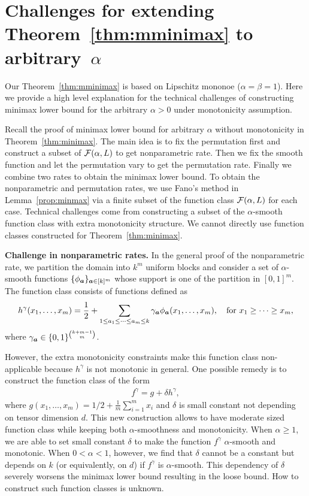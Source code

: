 \documentclass[12pt]{article}
\theoremstyle{definition}
\begin{document}
{\color{blue}
\section{Challenges for extending Theorem~\ref{thm:mminimax} to arbitrary~$\alpha$}\label{subsec:generala}
Our Theorem~\ref{thm:mminimax} is based on Lipschitz mononoe ($\alpha = \beta=1$). Here we provide a high level explanation for the technical challenges of constructing minimax lower bound for the arbitrary $\alpha>0$ under monotonicity assumption. 

Recall the proof of minimax lower bound for arbitrary $\alpha$ without monotonicity in Theorem~\ref{thm:minimax}. The main idea is to fix the permutation first and construct a subset of $\mathcal{F}(\alpha,L)$ to get nonparametric rate. Then we fix the smooth function and let the permutation vary to get the permutation rate. Finally we combine two rates to obtain the minimax lower bound. To obtain the nonparametric and permutation rates, we use Fano's method in Lemma~\ref{prop:minmax} via a finite subset of the function class $\mathcal{F}(\alpha,L)$ for each case. Technical challenges come from constructing a subset of the $\alpha$-smooth function class with extra monotonicity structure. We cannot directly use function classes constructed for Theorem~\ref{thm:minimax}. 

{\bf Challenge in nonparametric rates.} In the general proof of the nonparametric rate, we partition the domain  into $k^m$ uniform blocks and consider a set of $\alpha$-smooth functions $\{\phi_{\bm{a}}\}_{\bm{a}\in [k]^m}$ whose support is one of the partition in $[0,1]^m$. The function class consists of functions defined as
\begin{align}
    h^{\gamma}(x_1,\ldots,x_m) = \frac{1}{2}+\sum_{1\leq a_1\leq\cdots\leq a_m\leq k}\gamma_{\bm{a}}\phi_{\bm{a}}(x_1,\ldots,x_m),\quad \text{for } x_1\geq\cdots\geq x_m,
\end{align}
where $\gamma_{\bm{a}}\in\{0,1\}^{k+m-1\choose m}$. 

However, the extra monotonicity constraints make this function class non-applicable because $h^{\gamma}$ is not monotonic in general. One possible remedy is to construct the function class of the form
\begin{align}
    f^{\gamma} = g + \delta h^{\gamma},
\end{align}
where $g(x_1,\ldots,x_m) = 1/2+\frac{1}{m}\sum_{i = 1}^m x_i$ and $\delta$ is small constant not depending on tensor dimension $d$. This new construction allows to have moderate sized function class while keeping both $\alpha$-smoothness and monotonicity. When $\alpha\geq 1$, we are able to set small constant $\delta$ to make the function $f^{\gamma}$ $\alpha$-smooth and monotonic. When $0<\alpha<1$, however, we find that $\delta$ cannot be a constant but depends on $k$ (or equivalently, on  $d$) if  $f^{\gamma}$ is $\alpha$-smooth.  This dependency of $\delta$ severely worsens the minimax lower bound resulting in the loose bound. How to construct such function classes is unknown. 

}
\end{document}
